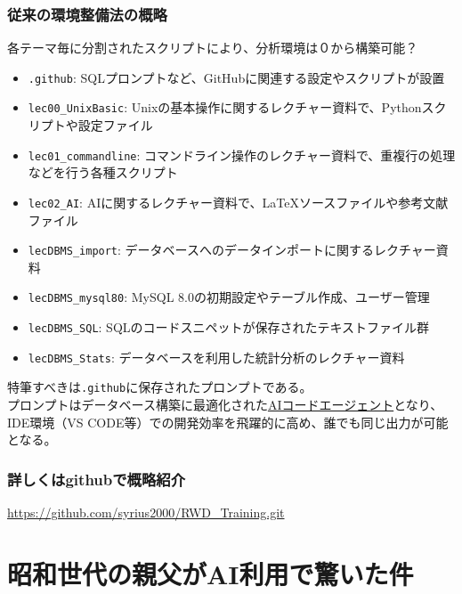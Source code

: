 \documentclass[uplatex,dvipdfmx,9pt,a4paper]{beamer}
\begin{document}
\begin{frame}[fragile]%
  \frametitle{従来の環境整備法の概略}

 各テーマ毎に分割されたスクリプトにより、分析環境は０から構築可能？
 \vspace{0.5cm}

\small
\begin{itemize}
  \item \texttt{.github}: SQLプロンプトなど、GitHubに関連する設定やスクリプトが設置
  \item \texttt{lec00\_UnixBasic}: Unixの基本操作に関するレクチャー資料で、Pythonスクリプトや設定ファイル
  \item \texttt{lec01\_commandline}: コマンドライン操作のレクチャー資料で、重複行の処理などを行う各種スクリプト
  \item \texttt{lec02\_AI}: AIに関するレクチャー資料で、LaTeXソースファイルや参考文献ファイル
  \item \texttt{lecDBMS\_import}: データベースへのデータインポートに関するレクチャー資料
  \item \texttt{lecDBMS\_mysql80}: MySQL 8.0の初期設定やテーブル作成、ユーザー管理
  \item \texttt{lecDBMS\_SQL}: SQLのコードスニペットが保存されたテキストファイル群
  \item \texttt{lecDBMS\_Stats}: データベースを利用した統計分析のレクチャー資料
\end{itemize}
\normalsize
\vspace{0.5cm}

特筆すべきは\texttt{.github}に保存されたプロンプトである。\\

プロンプトはデータベース構築に最適化された\underline{AIコードエージェント}となり、
IDE環境（VS CODE等）での開発効率を飛躍的に高め、誰でも同じ出力が可能となる。



\end{frame}

\begin{frame}%
  \frametitle{詳しくはgithubで概略紹介}
\begin{center}
  \url{https://github.com/syrius2000/RWD_Training.git}
\end{center}

\end{frame}

\section{昭和世代の親父がAI利用で驚いた件}
\end{document}
